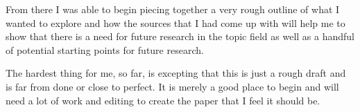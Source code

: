 \documentclass[10pt]{IEEEtran}
\begin{document}
From there I was able to begin piecing together a very rough outline of what I wanted to 
explore and how the sources that I had come up with will help me to show that there is a 
need for future research in the topic field as well as a handful of potential starting 
points for future research.

The hardest thing for me, so far, is excepting that this is just a rough draft and is far 
from done or close to perfect. It is merely a good place to begin and will need a lot of 
work and editing to create the paper that I feel it should be.
\end{document}
